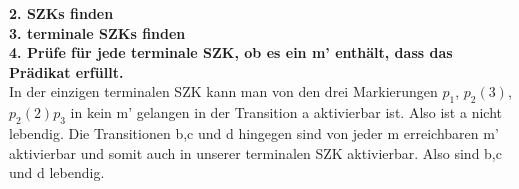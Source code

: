 \documentclass[a4paper,12pt]{scrartcl}
\begin{document}
\textbf{2. SZKs finden}\\
\textbf{3. terminale SZKs finden}\\
\textbf{4. Prüfe für jede terminale SZK, ob es ein m' enthält, dass das Prädikat erfüllt.} \\
In der einzigen terminalen SZK kann man von den drei Markierungen $p_1$, $p_2 (3)$,$p_2 (2)p_3$ in kein m' gelangen in der Transition a aktivierbar ist. Also ist a nicht lebendig. Die Transitionen b,c und d hingegen sind von jeder m erreichbaren m' aktivierbar und somit auch in unserer terminalen SZK aktivierbar. Also sind b,c und d lebendig.
\subsection{}
\subsection{}
\end{document}
